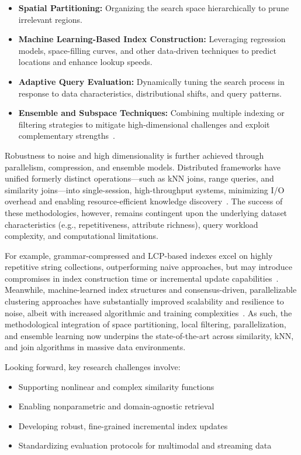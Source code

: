 \begin{itemize}
    \item \textbf{Spatial Partitioning:} Organizing the search space hierarchically to prune irrelevant regions.
    \item \textbf{Machine Learning-Based Index Construction:} Leveraging regression models, space-filling curves, and other data-driven techniques to predict locations and enhance lookup speeds.
    \item \textbf{Adaptive Query Evaluation:} Dynamically tuning the search process in response to data characteristics, distributional shifts, and query patterns.
    \item \textbf{Ensemble and Subspace Techniques:} Combining multiple indexing or filtering strategies to mitigate high-dimensional challenges and exploit complementary strengths~\cite{ref30,ref31,ref34,ref35,ref39,ref45,ref47,ref50,ref51,ref54,ref56,ref73,ref75,ref86,ref91,ref98,ref107,ref111,ref114,ref118}.
\end{itemize}

Robustness to noise and high dimensionality is further achieved through parallelism, compression, and ensemble models. Distributed frameworks have unified formerly distinct operations---such as kNN joins, range queries, and similarity joins---into single-session, high-throughput systems, minimizing I/O overhead and enabling resource-efficient knowledge discovery~\cite{ref116,ref118}. The success of these methodologies, however, remains contingent upon the underlying dataset characteristics (e.g., repetitiveness, attribute richness), query workload complexity, and computational limitations.

For example, grammar-compressed and LCP-based indexes excel on highly repetitive string collections, outperforming naive approaches, but may introduce compromises in index construction time or incremental update capabilities~\cite{ref73,ref91,ref98}. Meanwhile, machine-learned index structures and consensus-driven, parallelizable clustering approaches have substantially improved scalability and resilience to noise, albeit with increased algorithmic and training complexities~\cite{ref111,ref116}. As such, the methodological integration of space partitioning, local filtering, parallelization, and ensemble learning now underpins the state-of-the-art across similarity, kNN, and join algorithms in massive data environments.

Looking forward, key research challenges involve:

\begin{itemize}
    \item Supporting nonlinear and complex similarity functions
    \item Enabling nonparametric and domain-agnostic retrieval
    \item Developing robust, fine-grained incremental index updates
    \item Standardizing evaluation protocols for multimodal and streaming data
\end{itemize}


